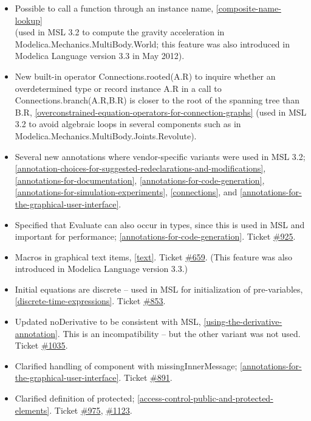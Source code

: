 \documentclass[10pt,a4paper]{report}
\begin{document}
\begin{itemize}
\item
  Possible to call a function through an instance name, \ref{composite-name-lookup}\\
  (used in MSL 3.2 to compute the gravity acceleration in
  Modelica.Mechanics.MultiBody.World; this feature was also introduced
  in Modelica Language version 3.3 in May 2012).
\item
  New built-in operator Connections.rooted(A.R) to inquire whether an
  overdetermined type or record instance A.R in a call to
  Connections.branch(A.R,B.R) is closer to the root of the spanning tree
  than B.R, \ref{overconstrained-equation-operators-for-connection-graphs} (used in MSL 3.2 to avoid algebraic loops in
  several components such as in
  Modelica.Mechanics.MultiBody.Joints.Revolute).
\item
  Several new annotations where vendor-specific variants were used in
  MSL 3.2; \ref{annotation-choices-for-suggested-redeclarations-and-modifications}, 
  \ref{annotations-for-documentation}, \ref{annotations-for-code-generation}, 
  \ref{annotations-for-simulation-experiments}, \ref{connections}, and \ref{annotations-for-the-graphical-user-interface}.
\item
  Specified that Evaluate can also occur in types, since this is used in
  MSL and important for performance; \ref{annotations-for-code-generation}. Ticket
  \href{https://trac.modelica.org/Modelica/ticket/925}{\#925}.
\item
  Macros in graphical text items, \ref{text}. Ticket
  \href{https://trac.modelica.org/Modelica/ticket/659}{\#659}. (This
  feature was also introduced in Modelica Language version 3.3.)
\item
  Initial equations are discrete -- used in MSL for initialization of
  pre-variables, \ref{discrete-time-expressions}. Ticket
  \href{https://trac.modelica.org/Modelica/ticket/853}{\#853}.
\item
  Updated noDerivative to be consistent with MSL, \ref{using-the-derivative-annotation}. This
  is an incompatibility -- but the other variant was not used. Ticket
  \href{https://trac.modelica.org/Modelica/ticket/1035}{\#1035}.
\item
  Clarified handling of component with missingInnerMessage; 
  \ref{annotations-for-the-graphical-user-interface}. Ticket
  \href{https://trac.modelica.org/Modelica/ticket/891}{\#891}.
\item
  Clarified definition of protected; \ref{access-control-public-and-protected-elements}. Ticket
  \href{https://trac.modelica.org/Modelica/ticket/975}{\#975},
  \href{https://trac.modelica.org/Modelica/ticket/1123}{\#1123}.
\end{itemize}
\end{document}

